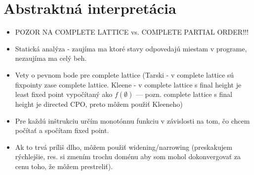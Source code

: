 \documentclass[paper=a4, fontsize=11pt]{scrartcl} %
\numberwithin{equation}{section} %
\numberwithin{figure}{section} %
\numberwithin{table}{section} %
\begin{document}
	\section{Abstraktná interpretácia}
	
	\begin{itemize}
		\item POZOR NA COMPLETE LATTICE vs. COMPLETE PARTIAL ORDER!!!
		\item Statická analýza - zaujíma ma ktoré stavy odpovedajú miestam v programe, nezaujíma ma celý beh.
		\item Vety o pevnom bode pre complete lattice (Tarski - v complete lattice sú fixpointy zase complete lattice. Kleene - v complete lattice s final height je least fixed point vypočítaný ako $f(\emptyset)$ — pozn. complete lattice s final height je directed CPO, preto môžem použiť Kleeneho)
		
		\item Pre každú inštrukciu určím monotónnu funkciu v závislosti na tom, čo chcem počítať a spočítam fixed point.
		\item Ak to trvá príliš dlho, môžem použiť widening/narrowing (preskakujem rýchlejšie, res. si zmením trochu doménu aby som mohol dokonvergovať za cenu toho, že môžem prestreliť).
	\end{itemize}
	
\end{document}
